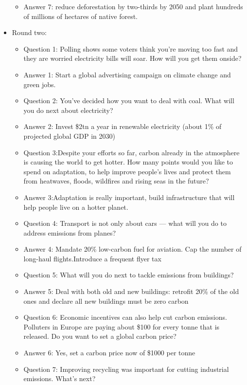 \documentclass[12pt]{article}
\begin{document}
\begin{itemize}
\begin{itemize}
        \item Answer 7: reduce deforestation by two-thirds by 2050 and plant hundreds of millions of hectares of native forest.
    \end{itemize}
    \item Round two:\begin{itemize}
        \item Question 1: Polling shows some voters think you're moving too fast and they are worried electricity bills will soar. How will you get them onside?
        \item Answer 1: Start a global advertising campaign on climate change and green jobs.
        \item Question 2: You've decided how you want to deal with coal. What will you do next about electricity?
        \item Answer 2: Invest \$2tn a year in renewable electricity (about 1\% of projected global GDP in 2030) 
        \item Question 3:Despite your efforts so far, carbon already in the atmosphere is causing the world to get hotter. How many points would you like to spend on adaptation, to help improve people's lives and protect them from heatwaves, floods, wildfires and rising seas in the future?
        \item Answer 3:Adaptation is really important, build infrastructure that will help people live on a hotter planet.
        \item Question 4: Transport is not only about cars — what will you do to address emissions from planes?
        \item Answer 4: Mandate 20\% low-carbon fuel for aviation. Cap the number of long-haul flights.Introduce a frequent flyer tax
        \item Question 5: What will you do next to tackle emissions from buildings?
        \item Answer 5: Deal with both old and new buildings: retrofit 20\% of the old ones and declare all new buildings must be zero carbon
        \item Question 6: Economic incentives can also help cut carbon emissions. Polluters in Europe are paying about \$100 for every tonne that is released. Do you want to set a global carbon price?
        \item Answer 6: Yes, set a carbon price now of \$1000 per tonne
        \item Question 7: Improving recycling was important for cutting industrial emissions. What's next?

\end{itemize}
\end{itemize}
\end{document}
